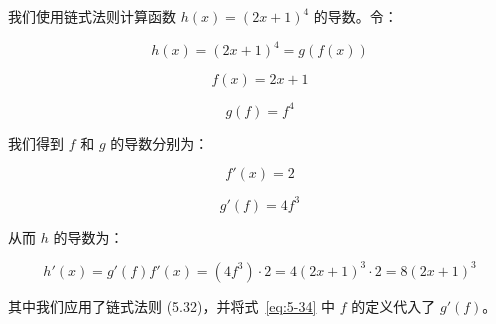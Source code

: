\begin{notebox}
我们使用链式法则计算函数 $ h(x) = (2x + 1)^4 $ 的导数。令：

\begin{equation}
h(x) = (2x + 1)^4 = g(f(x))
\tag{5.33}\label{eq:5-33}
\end{equation}

\begin{equation}
f(x) = 2x + 1
\tag{5.34}\label{eq:5-34}
\end{equation}

\begin{equation}
g(f) = f^4
\tag{5.35}\label{eq:5-35}
\end{equation}

我们得到 $ f $ 和 $ g $ 的导数分别为：

\begin{equation}
f'(x) = 2
\tag{5.36}\label{eq:5-36}
\end{equation}

\begin{equation}
g'(f) = 4f^3
\tag{5.37}\label{eq:5-37}
\end{equation}

从而 $ h $ 的导数为：

\begin{equation}
h'(x) = g'(f)f'(x) = (4f^3) \cdot 2 = 4(2x + 1)^3 \cdot 2 = 8(2x + 1)^3
\tag{5.38}\label{eq:5-38}
\end{equation}

其中我们应用了链式法则 (5.32)，并将式~\eqref{eq:5-34} 中 $ f $ 的定义代入了 $ g'(f) $。
\end{notebox}
